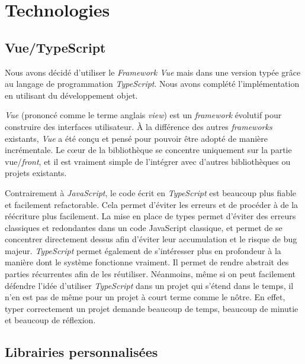 \documentclass[a4paper, 12pt]{report}
\begin{document}
\chapter{Technologies}

\section{Vue/TypeScript}

\tabto{1cm}Nous avons décidé d'utiliser le \textit{Framework Vue} mais dans une version typée grâce au
langage de programmation \textit{TypeScript}. Nous avons complété l'implémentation en utilisant du développement objet.

\vspace{0.5cm}

\tabto{1cm}\textit{Vue} (prononcé comme le terme anglais \textit{view}) est un \textit{framework} évolutif pour construire des
interfaces utilisateur. À la différence des autres \textit{frameworks} existants, \textit{Vue} a été conçu et pensé
pour pouvoir être adopté de manière incrémentale. Le cœur de la bibliothèque se concentre uniquement
sur la partie vue/\textit{front}, et il est vraiment simple de l’intégrer avec d’autres bibliothèques ou projets
existants.

\vspace{0.5cm}

\tabto{1cm}Contrairement à \textit{JavaScript}, le code écrit en \textit{TypeScript} est beaucoup plus fiable et facilement refactorable. 
Cela permet d'éviter les erreurs et de procéder à de la réécriture plus facilement.
La mise en place de types permet d'éviter des erreurs classiques et redondantes dans un code JavaScript classique,
et permet de se concentrer directement dessus afin d'éviter leur accumulation et le risque de bug majeur.
\tabto{1cm} \textit{TypeScript} permet également de s'intéresser plus en profondeur à la manière dont le système fonctionne vraiment.
Il permet de rendre abstrait des parties récurrentes afin de les réutiliser.
\tabto{1cm} Néanmoins, même si on peut facilement défendre l'idée d'utiliser \textit{TypeScript} dans un projet qui s'étend dans
le temps, il n'en est pas de même pour un projet à court terme comme le nôtre. En effet, typer correctement un projet
demande beaucoup de temps, beaucoup de minutie et beaucoup de réflexion.

\section{Librairies personnalisées}
\end{document}
